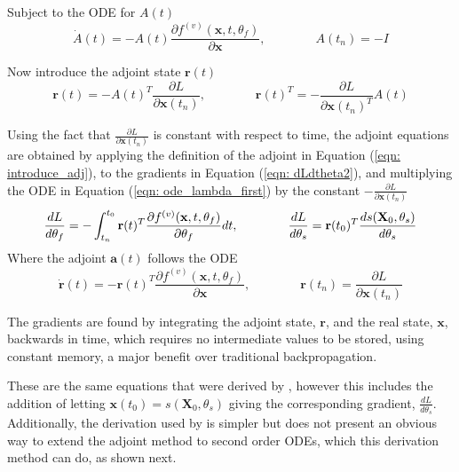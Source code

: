 \documentclass{article}
\theoremstyle{remark}
\theoremstyle{definition}
\begin{document}
Subject to the ODE for $A(t)$
\begin{equation}
\label{eqn: ode_lambda_first}
    \dot{A}(t) = -A(t)\frac{\partial f^{(v)}(\mathbf{x}, t, \theta_{f})}{\partial \mathbf{x}},
    \qquad
    \qquad
    A(t_{n}) = -I
\end{equation}

Now introduce the adjoint state $\mathbf{r}(t)$
\begin{equation}
\label{eqn: introduce_adj}
    \mathbf{r}(t) = -A(t)^{T}\frac{\partial L}{\partial \mathbf{x}(t_{n})},
    \qquad
    \qquad
    \mathbf{r}(t)^{T} = -\frac{\partial L}{\partial \mathbf{x}(t_{n})^{T}}A(t)
\end{equation}

Using the fact that $\displaystyle  \frac{\partial L}{\partial \mathbf{x}(t_{n})}$ is constant with respect to time, the adjoint equations are obtained by applying the definition of the adjoint in Equation (\ref{eqn: introduce_adj}), to the gradients in Equation (\ref{eqn: dLdtheta2}), and multiplying the ODE in Equation (\ref{eqn: ode_lambda_first}) by the constant $-\frac{\partial L}{\partial \mathbf{x}(t_{n})}$
\begin{equation}
\label{eqn: first_order_adjoint_method_grads}
    \frac{dL}{d\theta_{f}} = -\int_{t_{n}}^{t_{0}}\mathbf{r}(t)^{T}\frac{\partial f^{(v)}(\mathbf{x}, t, \theta_{f})}{\partial \theta_{f}}dt,
    \qquad
    \qquad
    \frac{dL}{d\theta_{s}}= \mathbf{r}(t_{0})^{T}\frac{ds(\mathbf{X}_{0}, \theta_{s})}{d\theta_{s}} \\
\end{equation}
Where the adjoint $\mathbf{a}(t)$ follows the ODE
\begin{equation}
\label{eqn: first_order_adjoint_method_ode}
    \dot{\mathbf{r}}(t) = -\mathbf{r}(t)^{T}\frac{\partial f^{(v)}(\mathbf{x}, t, \theta_{f})}{\partial \mathbf{x}},
    \qquad
    \qquad
    \mathbf{r}(t_{n}) = \frac{\partial L}{\partial \mathbf{x}(t_{n})}
\end{equation}

The gradients are found by integrating the adjoint state, $\mathbf{r}$, and the real state, $\mathbf{x}$, backwards in time, which requires no intermediate values to be stored, using constant memory, a major benefit over traditional backpropagation.


These are the same equations that were derived by \citet{chen2018neural}, however this includes the addition of letting $\mathbf{x}(t_{0}) = s(\mathbf{X}_{0}, \theta_{s})$ giving the corresponding gradient, $\displaystyle  \frac{dL}{d\theta_{s}}$. Additionally, the derivation used by \citet{chen2018neural} is simpler but does not present an obvious way to extend the adjoint method to second order ODEs, which this derivation method can do, as shown next.
\end{document}
